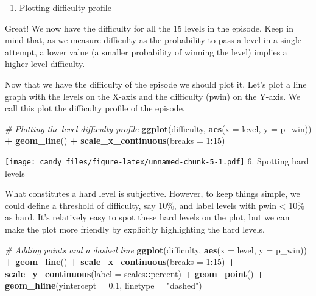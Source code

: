 \documentclass[
]{article}
\newenvironment{Shaded}{\begin{snugshade}}{\end{snugshade}}
\newcommand{\AttributeTok}[1]{\textcolor[rgb]{0.13,0.29,0.53}{#1}}
\newcommand{\CommentTok}[1]{\textcolor[rgb]{0.56,0.35,0.01}{\textit{#1}}}
\newcommand{\DecValTok}[1]{\textcolor[rgb]{0.00,0.00,0.81}{#1}}
\newcommand{\FloatTok}[1]{\textcolor[rgb]{0.00,0.00,0.81}{#1}}
\newcommand{\FunctionTok}[1]{\textcolor[rgb]{0.13,0.29,0.53}{\textbf{#1}}}
\newcommand{\NormalTok}[1]{#1}
\newcommand{\SpecialCharTok}[1]{\textcolor[rgb]{0.81,0.36,0.00}{\textbf{#1}}}
\newcommand{\StringTok}[1]{\textcolor[rgb]{0.31,0.60,0.02}{#1}}
\providecommand{\tightlist}{%
  \setlength{\itemsep}{0pt}\setlength{\parskip}{0pt}}
\begin{document}
\begin{enumerate}
\def\labelenumi{\arabic{enumi}.}
\setcounter{enumi}{4}
\tightlist
\item
  Plotting difficulty profile
\end{enumerate}

Great! We now have the difficulty for all the 15 levels in the episode.
Keep in mind that, as we measure difficulty as the probability to pass a
level in a single attempt, a lower value (a smaller probability of
winning the level) implies a higher level difficulty.

Now that we have the difficulty of the episode we should plot it. Let's
plot a line graph with the levels on the X-axis and the difficulty
(pwin) on the Y-axis. We call this plot the difficulty profile of the
episode.

\begin{Shaded}
\begin{Highlighting}[]
\CommentTok{\# Plotting the level difficulty profile}
\FunctionTok{ggplot}\NormalTok{(difficulty, }\FunctionTok{aes}\NormalTok{(}\AttributeTok{x =}\NormalTok{ level, }\AttributeTok{y =}\NormalTok{ p\_win)) }\SpecialCharTok{+}
\FunctionTok{geom\_line}\NormalTok{() }\SpecialCharTok{+}
\FunctionTok{scale\_x\_continuous}\NormalTok{(}\AttributeTok{breaks =} \DecValTok{1}\SpecialCharTok{:}\DecValTok{15}\NormalTok{) }
\end{Highlighting}
\end{Shaded}

\texttt{[image: candy\_files/figure-latex/unnamed-chunk-5-1.pdf]} 6.
Spotting hard levels

What constitutes a hard level is subjective. However, to keep things
simple, we could define a threshold of difficulty, say 10\%, and label
levels with pwin \textless{} 10\% as hard. It's relatively easy to spot
these hard levels on the plot, but we can make the plot more friendly by
explicitly highlighting the hard levels.

\begin{Shaded}
\begin{Highlighting}[]
\CommentTok{\# Adding points and a dashed line}
\FunctionTok{ggplot}\NormalTok{(difficulty, }\FunctionTok{aes}\NormalTok{(}\AttributeTok{x =}\NormalTok{ level, }\AttributeTok{y =}\NormalTok{ p\_win)) }\SpecialCharTok{+}
\FunctionTok{geom\_line}\NormalTok{() }\SpecialCharTok{+}
\FunctionTok{scale\_x\_continuous}\NormalTok{(}\AttributeTok{breaks =} \DecValTok{1}\SpecialCharTok{:}\DecValTok{15}\NormalTok{) }\SpecialCharTok{+}
\FunctionTok{scale\_y\_continuous}\NormalTok{(}\AttributeTok{label =}\NormalTok{ scales}\SpecialCharTok{::}\NormalTok{percent) }\SpecialCharTok{+}
\FunctionTok{geom\_point}\NormalTok{() }\SpecialCharTok{+}
\FunctionTok{geom\_hline}\NormalTok{(}\AttributeTok{yintercept =} \FloatTok{0.1}\NormalTok{, }\AttributeTok{linetype =} \StringTok{"dashed"}\NormalTok{)}
\end{Highlighting}
\end{Shaded}
\end{document}
